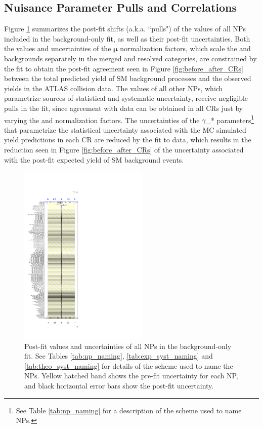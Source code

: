 \subsection{Nuisance Parameter Pulls and Correlations}

Figure \ref{fig:pull_bkgonly} summarizes the post-fit shifts (a.k.a. ``pulls") of the values of all NPs included in the background-only fit, as well as their post-fit uncertainties. Both the values and uncertainties of the \(\boldsymbol{\mu}\) normalization factors, which scale the \wjets and \ttbar backgrounds separately in the merged and resolved categories, are constrained by the fit to obtain the post-fit agreement seen in Figure \ref{fig:before_after_CRs} between the total predicted yield of SM background processes and the observed yields in the ATLAS collision data. The values of all other NPs, which parametrize sources of statistical and systematic uncertainty, receive negligible pulls in the fit, since agreement with data can be obtained in all CRs just by varying the \wjets and \ttbar normalization factors. The uncertainties of the \(\gamma\)\_* parameters\footnote{See Table \ref{tab:np_naming} for a description of the scheme used to name NPs.} that parametrize the statistical uncertainty associated with the MC simulated yield predictions in each CR are reduced by the fit to data, which results in the reduction seen in Figure \ref{fig:before_after_CRs} of the uncertainty associated with the post-fit expected yield of SM background events.

\begin{figure}[h]
  \centering
  \includegraphics[width=0.55\textwidth]{Figures/8/BkgOnly/fit_parameters.pdf}
  \caption[Pull plots for background-only fit]{\footnotesize{Post-fit values and uncertainties of all NPs in the background-only fit. See Tables \ref{tab:np_naming}, \ref{tab:exp_syst_naming} and \ref{tab:theo_syst_naming} for details of the scheme used to name the NPs. Yellow hatched band shows the pre-fit uncertainty for each NP, and black horizontal error bars show the post-fit uncertainty.}}
  \label{fig:pull_bkgonly}
\end{figure}

